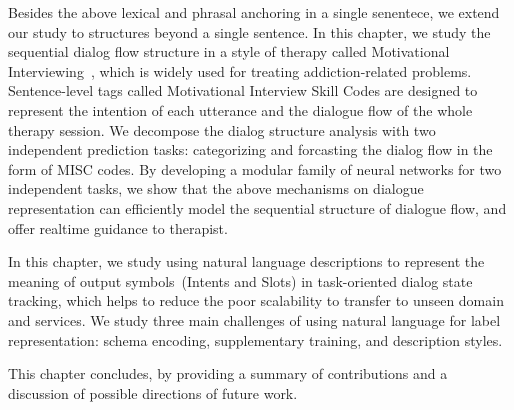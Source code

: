  Besides the above lexical and phrasal anchoring in a
single senentece, we extend our study to structures beyond a single
sentence. In this chapter, we study the sequential dialog flow
structure in a style of therapy called Motivational
Interviewing~\cite[MI,][]{miller2003motivational,miller2012motivational},
which is widely used for treating addiction-related problems.
Sentence-level tags called Motivational Interview Skill Codes are
designed to represent the intention of each utterance and the dialogue
flow of the whole therapy session. We decompose the dialog structure
analysis with two independent prediction tasks: categorizing and
forcasting the dialog flow in the form of MISC codes. By developing a
modular family of neural networks for two independent tasks, we show
that the above mechanisms on dialogue representation can efficiently
model the sequential structure of dialogue flow, and offer realtime
guidance to therapist.

 In this
chapter, we study using natural language descriptions to represent the
meaning of output symbols~(Intents and Slots) in task-oriented dialog
state tracking, which helps to reduce the poor scalability to transfer
to unseen domain and services. We study three main challenges of using
natural language for label representation: schema encoding,
supplementary training, and description styles.


 This chapter
concludes, by providing a summary of contributions and a discussion of
possible directions of future work.


